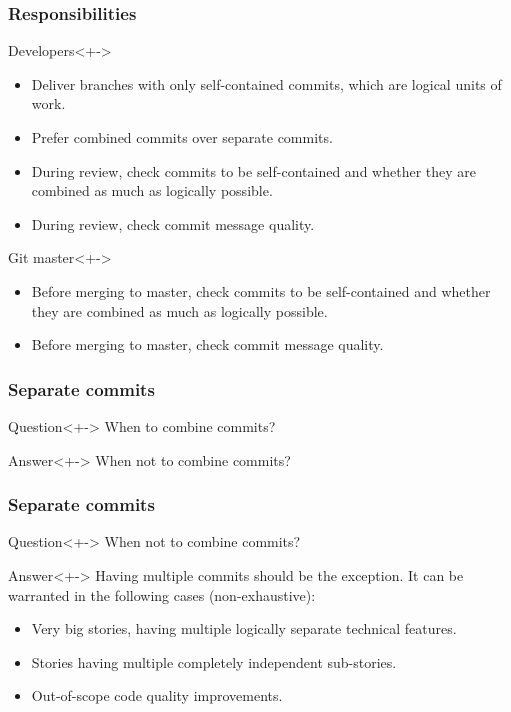 \begin{frame}
	\frametitle{Responsibilities}
	\begin{block}{Developers}<+->
		\begin{itemize}[<+-| highlight@+>]
			\item Deliver branches with only self-contained commits, which are logical units of work.
			\item Prefer combined commits over separate commits.
			\item During review, check commits to be self-contained and whether they are combined as much as logically possible.
			\item During review, check commit message quality.
		\end{itemize}
	\end{block}
	\begin{block}{Git master}<+->
		\begin{itemize}[<+-| highlight@+>]
			\item Before merging to master, check commits to be self-contained and whether they are combined as much as logically possible.
			\item Before merging to master, check commit message quality.
		\end{itemize}
	\end{block}
\end{frame}


\begin{frame}
	\frametitle{Separate commits}
	\begin{block}{Question}<+->
		When to combine commits?
	\end{block}
	\begin{block}{Answer}<+->
		When not to combine commits?
	\end{block}
\end{frame}


\begin{frame}
	\frametitle{Separate commits}
	\begin{block}{Question}<+->
		When not to combine commits?
	\end{block}
	\begin{block}{Answer}<+->
		Having multiple commits should be the exception. It can be warranted in the following cases (non-exhaustive):
		\begin{itemize}[<+-| highlight@+>]
			\item Very big stories, having multiple logically separate technical features.
			\item Stories having multiple completely independent sub-stories.
			\item Out-of-scope code quality improvements.
		\end{itemize}
	\end{block}
\end{frame}


